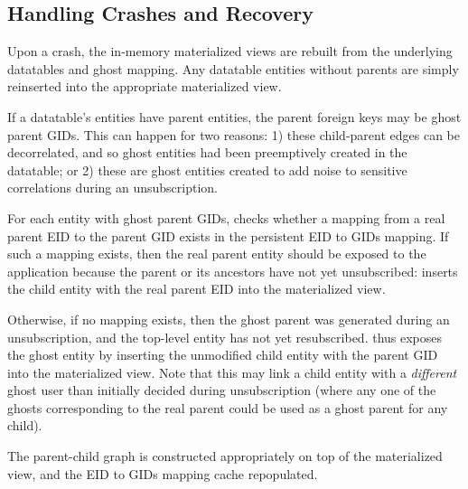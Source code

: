 \subsection{Handling Crashes and Recovery}
Upon a crash, the in-memory materialized views are rebuilt from the underlying datatables and ghost
mapping. Any datatable entities without parents are simply reinserted into the appropriate
materialized view. 

If a datatable's entities have parent entities, the parent foreign keys may be ghost parent GIDs. 
This can happen for two reasons: 1) these child-parent edges can be decorrelated, and so ghost
entities had been preemptively created in the datatable; or 2) these are ghost entities created to
add noise to sensitive correlations during an unsubscription. 

For each entity with ghost parent GIDs, \sys checks whether a mapping
from a real parent EID to the parent GID exists in the persistent EID to GIDs mapping. 
If such a mapping exists, then the real parent entity should be exposed to the application because
the parent or its ancestors have not yet unsubscribed: \sys inserts the child entity with the real parent
EID into the materialized view.

Otherwise, if no mapping exists, then the ghost parent was generated during an unsubscription, and
the top-level entity has not yet resubscribed. \sys thus exposes the ghost entity by inserting the
unmodified child entity with the parent GID into the materialized view.
Note that this may link a child entity with a \emph{different} ghost user than initially decided
during unsubscription (where any one of the ghosts corresponding to the real parent could be used as
a ghost parent for any child). 

The parent-child graph is constructed appropriately on top of the materialized view, and the EID to
GIDs mapping cache repopulated.

